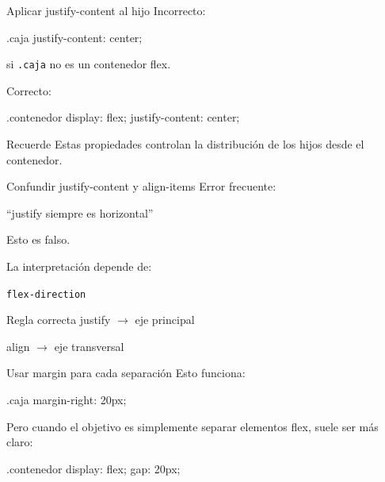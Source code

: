 \documentclass[aspectratio=169,11.5pt]{beamer}
\begin{document}
    \begin{frame}[fragile]{Aplicar justify-content al hijo}
        Incorrecto:

        \begin{csscodedark}
            .caja {
                justify-content: center;
            }
        \end{csscodedark}

        si \texttt{.caja} no es un contenedor flex.

        Correcto:

        \begin{csscodedark}
            .contenedor {
                display: flex;
                justify-content: center;
            }
        \end{csscodedark}

        \begin{alertblock}{Recuerde}
            Estas propiedades controlan
            la distribución de los hijos
            desde el contenedor.
        \end{alertblock}
    \end{frame}

    \begin{frame}{Confundir justify-content y align-items}
        Error frecuente:

        \begin{center}
            ``justify siempre es horizontal''
        \end{center}

        Esto es falso.

        La interpretación depende de:

        \begin{center}
            \Large
            \texttt{flex-direction}
        \end{center}

        \begin{block}{Regla correcta}
            justify $\rightarrow$ eje principal

            align $\rightarrow$ eje transversal
        \end{block}
    \end{frame}

    \begin{frame}[fragile]{Usar margin para cada separación}
        Esto funciona:

        \begin{csscodedark}
            .caja {
                margin-right: 20px;
            }
        \end{csscodedark}

        Pero cuando el objetivo es simplemente
        separar elementos flex, suele ser más claro:

        \begin{csscodedark}
            .contenedor {
                display: flex;
                gap: 20px;
            }
        \end{csscodedark}
    \end{frame}
\end{document}

